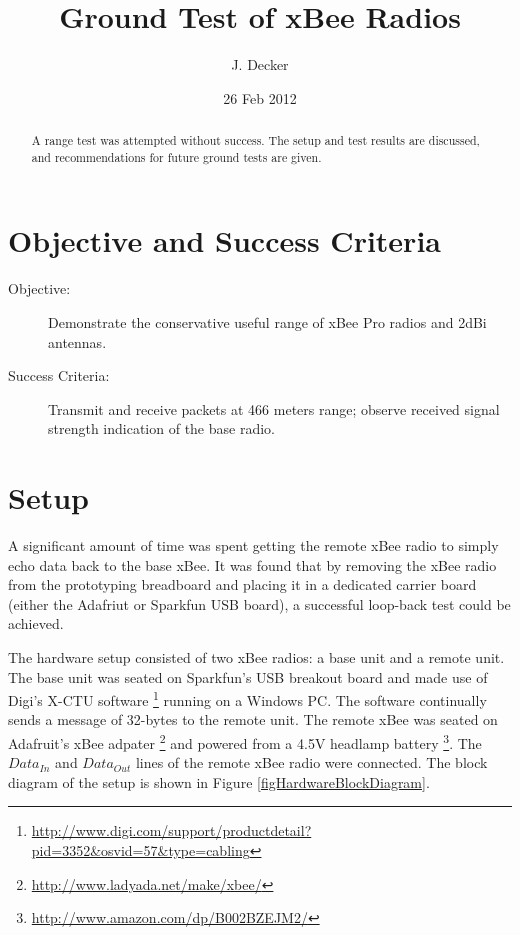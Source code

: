 \documentclass[11pt,letterpaper]{article}
\author{J. Decker}
\date{26 Feb 2012}
\title{Ground Test of xBee Radios}
\begin{document}
\maketitle
\begin{abstract}
A range test was attempted without success.  The setup and test results are discussed, and recommendations for future ground tests are given.
\end{abstract}

\section{Objective and Success Criteria}
\begin{description}
\item[Objective:] Demonstrate the conservative useful range of xBee Pro radios and 2dBi antennas.
\item[Success Criteria:] Transmit and receive packets at 466 meters range; observe received signal strength indication of the base radio.
\end{description}

\section{Setup}
A significant amount of time was spent getting the remote xBee radio to simply echo data back to the base xBee.  It was found that by removing the xBee radio from the prototyping breadboard and placing it in a dedicated carrier board (either the Adafriut or Sparkfun USB board), a successful loop-back test could be achieved.

The hardware setup consisted of two xBee radios: a base unit and a remote unit.  The base unit was seated on Sparkfun's USB breakout board and made use of Digi's X-CTU software \footnote{\url{http://www.digi.com/support/productdetail?pid=3352&osvid=57&type=cabling}} running on a Windows PC.  The software continually sends a message of 32-bytes to the remote unit.  The remote xBee was seated on Adafruit's xBee adpater	\footnote{\url{http://www.ladyada.net/make/xbee/}} and powered from a 4.5V headlamp battery \footnote{\url{http://www.amazon.com/dp/B002BZEJM2/}}. The $Data_{In}$ and $Data_{Out}$ lines of the remote xBee radio were connected.  The block diagram of the setup is shown in Figure \ref{figHardwareBlockDiagram}. 
\end{document}
